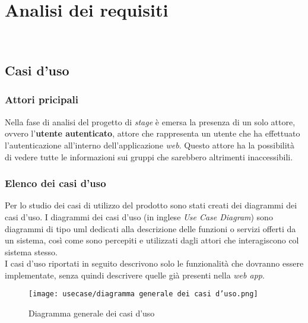
\chapter{Analisi dei requisiti}
\label{cap:analisi-requisiti}

\\

\section{Casi d'uso}
\subsection*{Attori pricipali}
Nella fase di analisi del progetto di \textit{stage} è emersa la presenza di un
solo attore, ovvero l'\textbf{utente autenticato},
attore che rappresenta un utente che ha effettuato l'autenticazione
all'interno dell'applicazione \textit{web}. Questo attore ha la possibilità di vedere
tutte le informazioni sui gruppi che sarebbero altrimenti inaccessibili.

\subsection*{Elenco dei casi d'uso}
Per lo studio dei casi di utilizzo del prodotto sono stati creati dei diagrammi
dei casi d'uso.
I diagrammi dei casi d'uso (in inglese \emph{Use Case Diagram}) sono diagrammi
di tipo \gls{uml} dedicati alla descrizione delle funzioni o servizi offerti da
un sistema, così come sono percepiti e utilizzati dagli attori che
interagiscono col sistema stesso.\\
I casi d'uso riportati in seguito descrivono solo le funzionalità che dovranno
essere implementate, senza quindi descrivere quelle già presenti nella
\textit{web app}.
\begin{figure}[H]
    \centering
    \texttt{[image: usecase/diagramma generale dei casi
        d'uso.png]}
    \caption{Diagramma generale dei casi d'uso}
\end{figure}

